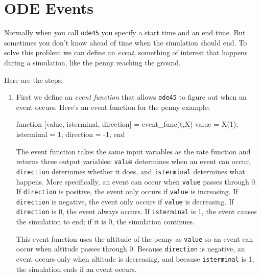 \section{ODE Events}
\label{events}


Normally when you call \lstinline{ode45} you specify a start time and
an end time.  But sometimes you don't know ahead of time when the
simulation should end.  To solve this problem we can define an \emph{event},
something of interest that happens during a simulation,
like the penny reaching the ground.

Here are the steps:


\begin{enumerate}

\item First we define an \emph{event function} that allows \lstinline{ode45} to figure out when
an event occurs.  Here's an event function for the penny example:

\begin{code}
function [value, isterminal, direction] = event_func(t,X)
    value = X(1);
    isterminal = 1;
    direction = -1;
end
\end{code}

The event function takes the same input variables as the rate function and returns three output variables: \lstinline{value} determines when an event can occur, \lstinline{direction} determines whether it does, and \lstinline{isterminal} determines what happens.
More specifically, an event can occur when \lstinline{value} passes through 0.
If \lstinline{direction} is positive, the event only occurs if \lstinline{value} is increasing.
 If \lstinline{direction} is negative, the event only occurs if \lstinline{value} is decreasing.
If \lstinline{direction} is 0, the event always occurs.
If \lstinline{isterminal} is 1, the event causes the simulation to end; if it is 0, the simulation continues.

This event function uses the altitude of the penny as \lstinline{value} so an event can occur when altitude passes through 0.
Because \lstinline{direction} is negative, an event occurs only when altitude is decreasing, and
because \lstinline{isterminal} is 1, the simulation ends if an event occurs.



\end{enumerate}
